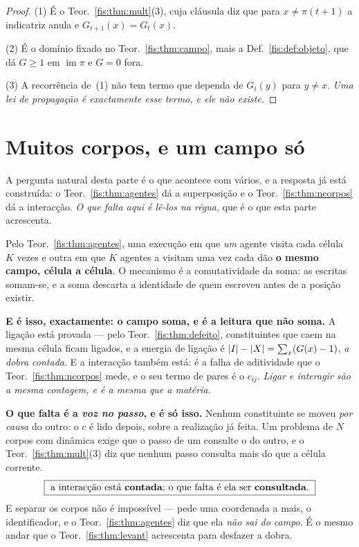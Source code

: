 \documentclass[livro.tex]{subfiles}
\begin{document}
\begin{proof}
(1) É o Teor.~\ref{fis:thm:mult}(3), cuja cláusula diz que para $x\neq\pi(t+1)$ a
indicatriz anula e $G_{t+1}(x)=G_t(x)$.

(2) É o domínio fixado no Teor.~\ref{fis:thm:campo}, mais a
Def.~\ref{fis:def:objeto}, que dá $G\ge1$ em $\operatorname{im}\pi$ e $G=0$ fora.

(3) A recorrência de~(1) não tem termo que dependa de $G_t(y)$ para $y\neq x$.
\emph{Uma lei de propagação é exactamente esse termo, e ele não existe.}
\end{proof}

\section{Muitos corpos, e um campo só}\label{fis:grav-ncorpos}

\noindent A pergunta natural desta parte é o que acontece com vários, e a
resposta já está construída: o Teor.~\ref{fis:thm:agentes} dá a superposição e o
Teor.~\ref{fis:thm:ncorpos} dá a interacção. \emph{O que falta aqui é lê-los na
régua}, que é o que esta parte acrescenta.

\medskip\noindent Pelo Teor.~\ref{fis:thm:agentes}, uma execução em que \emph{um}
agente visita cada célula $K$ vezes e outra em que $K$ agentes a visitam uma vez
cada dão \textbf{o mesmo campo, célula a célula}. O mecanismo é a comutatividade
da soma: as escritas somam-se, e a soma descarta a identidade de quem escreveu
antes de a posição existir.

\medskip\noindent\textbf{E é isso, exactamente: o campo soma, e é a leitura que
não soma.} A ligação está provada --- pelo Teor.~\ref{fis:thm:defeito},
constituintes que caem na mesma célula ficam ligados, e a energia de ligação é
$\lvert I\rvert-\lvert X\rvert=\sum_x(G(x)-1)$, \emph{a dobra contada}. E a interacção também
está: é a falha de aditividade que o Teor.~\ref{fis:thm:ncorpos} mede, e o seu
termo de pares é o $c_{ij}$. \emph{Ligar e interagir são a mesma contagem, e é a
mesma que a matéria.}

\medskip\noindent\textbf{O que falta é a \emph{voz no passo}, e é só isso.}
Nenhum constituinte se moveu \emph{por causa} do outro: o $c$ é lido depois,
sobre a realização já feita. Um problema de $N$ corpos com dinâmica exige que o
passo de um consulte o do outro, e o Teor.~\ref{fis:thm:mult}(3) diz que nenhum
passo consulta mais do que a célula corrente.
\[
\boxed{\ \text{a interacção está \textbf{contada}; o que falta é ela ser \textbf{consultada}.}\ }
\]
E separar os corpos não é impossível --- pede uma coordenada a mais, o
identificador, e o Teor.~\ref{fis:thm:agentes} diz que ela \emph{não sai do
campo}. É o mesmo andar que o Teor.~\ref{fis:thm:levant} acrescenta para desfazer
a dobra.
\end{document}
